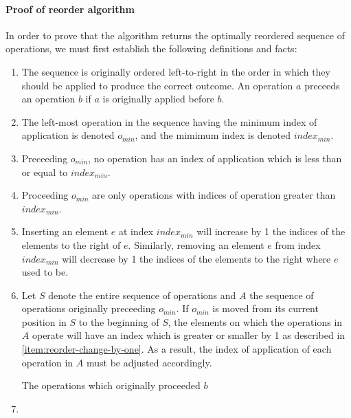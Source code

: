 \paragraph {Proof of reorder algorithm}
In order to prove that the algorithm returns the optimally reordered sequence of
operations, we must first establish the following definitions and facts:
\begin{enumerate}
  
  \item The sequence is originally ordered left-to-right in the order in which
  they should be applied to produce the correct outcome. An operation $a$
  preceeds an operation $b$ if $a$ is originally applied before $b$.
  \label{item:reorder-preceed}

  \item The left-most operation in the sequence having the minimum index of
  application is denoted $o_{min}$, and the mimimum index is denoted
  $index_{min}$.\noindent
  \label{item:reorder-o-min}

  \item Preceeding $o_{min}$, no operation has an index of application which is
  less than or equal to $index_{min}$.
  \label{item:reorder-preceeding-sequence}
  
  \item Proceeding $o_{min}$ are only operations with indices of operation
  greater than $index_{min}$.
  \label{item:reorder-proceeding-sequence}
  
  \item Inserting an element $e$ at index $index_{min}$ will increase by 1 the
  indices of the elements to the right of $e$. Similarly, removing an element
  $e$ from index $index_{min}$ will decrease by 1 the indices of the elements to
  the right where $e$ used to be.
  \label{item:reorder-change-by-one}
  
  \item Let $S$ denote the entire sequence of operations and $A$ the sequence of
  operations originally preceeding $o_{min}$. If $o_{min}$ is moved from its
  current position in $S$ to the beginning of $S$, the elements on which the
  operations in $A$ operate will have an index which is greater or smaller by 1
  as described in \ref{item:reorder-change-by-one}. As a result, the index of
  application of each operation in $A$ must be adjusted accordingly.
  
  The operations which originally proceeded $b$ 
  
  \item 
\end{enumerate}

